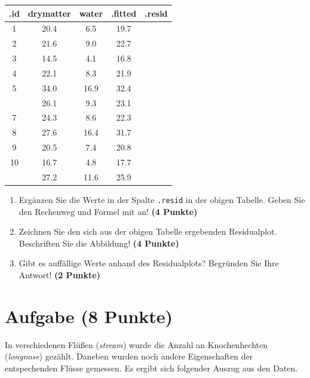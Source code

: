 \documentclass[a4paper, 10pt]{scrartcl}\usepackage[]{graphicx}\usepackage[]{color}
\newenvironment{knitrout}{}{} %
\begin{document}
\begin{knitrout}
\color{fgcolor}\begin{table}[!h]
\centering\begingroup\fontsize{12}{14}\selectfont

\begin{tabular}{ccccc}
\toprule
.id & drymatter & water & .fitted & .resid\\
\midrule
1 & 20.4 & 6.5 & 19.7 & \\
2 & 21.6 & 9.0 & 22.7 & \\
3 & 14.5 & 4.1 & 16.8 & \\
4 & 22.1 & 8.3 & 21.9 & \\
5 & 34.0 & 16.9 & 32.4 & \\
\addlinespace
6 & 26.1 & 9.3 & 23.1 & \\
7 & 24.3 & 8.6 & 22.3 & \\
8 & 27.6 & 16.4 & 31.7 & \\
9 & 20.5 & 7.4 & 20.8 & \\
10 & 16.7 & 4.8 & 17.7 & \\
\addlinespace
11 & 27.2 & 11.6 & 25.9 & \\
\bottomrule
\end{tabular}
\endgroup{}
\end{table}

\end{knitrout}

\begin{enumerate}
\item Erg{\"a}nzen Sie die Werte in der Spalte \texttt{.resid} in der obigen
  Tabelle. Geben Sie den Rechenweg und Formel mit an! \textbf{(4 Punkte)}
\item Zeichnen Sie den sich aus der obigen Tabelle ergebenden
  Residualplot. Beschriften Sie die Abbildung! \textbf{(4 Punkte)}
\item Gibt es auff{\"a}llige Werte anhand des Residualplots? Begr{\"u}nden Sie Ihre
  Antwort! \textbf{(2 Punkte)}
\end{enumerate}
 
\clearpage

\section{Aufgabe \hfill (8 Punkte)}



In verschiedenen Fl{\"u}{\ss}en (\textit{stream}) wurde die Anzahl an
Knochenhechten (\textit{longnose}) gez{\"a}hlt. Daneben wurden noch andere
Eigenschaften der entspechenden Fl{\"u}sse gemessen. Es ergibt sich folgender
Auszug aus den Daten. 
\end{document}
